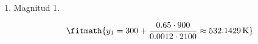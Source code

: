 \begin{enumerate}

\item Magnitud 1.

\[\fitmath{y_{1}=300+\frac{0.65\cdot 900}{0.0012\cdot 2100}\approx 532.1429\,\mathrm{K}}\]

\end{enumerate}

